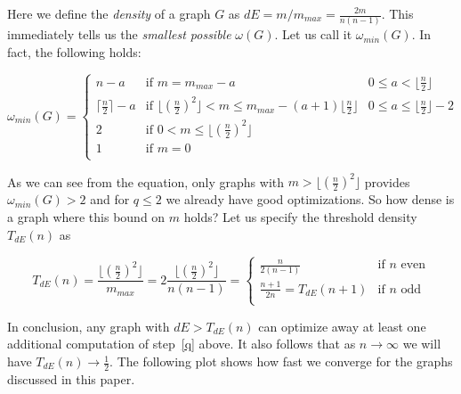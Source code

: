 \documentclass[a4paper]{article}
\begin{document}
Here we define the \emph{density} of a graph $G$ as $dE = m/m_{max} = \frac{2m}{n(n-1)}$. This immediately tells us the \emph{smallest possible} $\omega(G)$. Let us call it $\omega_{min}(G)$. In fact, the following holds:

\begin{equation}\label{omega}
\omega_{min}(G) = \left\{ \begin{array}{lll}
                           n - a & \text{if } m = m_{max} - a & 0 \leq a < \lfloor\frac{n}{2}\rfloor \\
                           \lceil\frac{n}{2}\rceil - a & \text{if } \lfloor(\frac{n}{2})^2\rfloor < m \leq m_{max} - (a + 1)\lfloor\frac{n}{2}\rfloor & 0 \leq a \leq \lfloor\frac{n}{2}\rfloor - 2 \\
                           2 & \text{if } 0 < m \leq \lfloor(\frac{n}{2})^2\rfloor & \\
                           1 & \text{if } m = 0 & \\
                          \end{array}
                  \right.
\end{equation}

As we can see from the equation, only graphs with $m > \lfloor(\frac{n}{2})^2\rfloor$ provides $\omega_{min}(G) > 2$ and for $q \leq 2$ we already have good optimizations. So how dense is a graph where this bound on $m$ holds? Let us specify the threshold density $T_{dE}(n)$ as

$$
T_{dE}(n) = \frac{\lfloor(\frac{n}{2})^2\rfloor}{m_{max}} = 2\frac{\lfloor(\frac{n}{2})^2\rfloor}{n(n-1)} = \left\{ \begin{array}{ll}
          \frac{n}{2(n-1)} & \text{if } n \text{ even}\\
          \frac{n + 1}{2n} = T_{dE}(n+1) & \text{if } n \text{ odd}\\
          \end{array}
  \right.
$$

In conclusion, any graph with $dE > T_{dE}(n)$ can optimize away at least one additional computation of step~\ref{q} above. It also follows that as $n \rightarrow \infty$ we will have $T_{dE}(n) \rightarrow \frac{1}{2}$. The following plot shows how fast we converge for the graphs discussed in this paper.

\begin{center}
\end{center}
\end{document}
